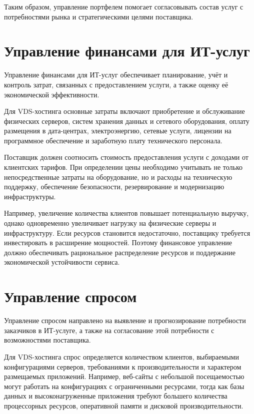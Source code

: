 \documentclass[14pt,a4paper]{extarticle}
\begin{document}
Таким образом, управление портфелем помогает согласовывать состав услуг с потребностями рынка и стратегическими целями поставщика.

\section{Управление финансами для ИТ-услуг}

Управление финансами для ИТ-услуг обеспечивает планирование, учёт и контроль затрат, связанных с предоставлением услуги, а также оценку её экономической эффективности.

Для VDS-хостинга основные затраты включают приобретение и обслуживание физических серверов, систем хранения данных и сетевого оборудования, оплату размещения в дата-центрах, электроэнергию, сетевые услуги, лицензии на программное обеспечение и заработную плату технического персонала.

Поставщик должен соотносить стоимость предоставления услуги с доходами от клиентских тарифов. При определении цены необходимо учитывать не только непосредственные затраты на оборудование, но и расходы на техническую поддержку, обеспечение безопасности, резервирование и модернизацию инфраструктуры.

Например, увеличение количества клиентов повышает потенциальную выручку, однако одновременно увеличивает нагрузку на физические серверы и инфраструктуру. Если ресурсов становится недостаточно, поставщику требуется инвестировать в расширение мощностей. Поэтому финансовое управление должно обеспечивать рациональное распределение ресурсов и поддержание экономической устойчивости сервиса.

\section{Управление спросом}

Управление спросом направлено на выявление и прогнозирование потребности заказчиков в ИТ-услуге, а также на согласование этой потребности с возможностями поставщика.

Для VDS-хостинга спрос определяется количеством клиентов, выбираемыми конфигурациями серверов, требованиями к производительности и характером размещаемых приложений. Например, веб-сайты с небольшой посещаемостью могут работать на конфигурациях с ограниченными ресурсами, тогда как базы данных и высоконагруженные приложения требуют большего количества процессорных ресурсов, оперативной памяти и дисковой производительности.
\end{document}
